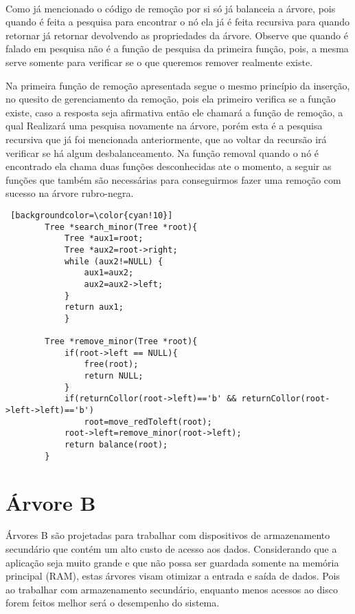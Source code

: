 \documentclass[report]{uftex}
\begin{document}
    \\Como já mencionado o código de remoção por si só já balanceia a árvore, pois quando é feita a pesquisa para encontrar o nó ela já é feita recursiva para quando retornar já retornar devolvendo as propriedades da árvore. Observe que quando é falado em pesquisa não é a função de pesquisa da primeira função, pois, a mesma serve somente para verificar se o que queremos remover realmente existe.
    
    Na primeira função de remoção apresentada segue o mesmo princípio da inserção, no quesito de gerenciamento da remoção, pois ela primeiro verifica se a função existe, caso a resposta seja afirmativa então ele chamará a função de remoção, a qual Realizará uma pesquisa novamente na árvore, porém esta é a pesquisa recursiva que já foi mencionada anteriormente, que ao voltar da recursão irá verificar se há algum desbalanceamento. Na função removal quando o nó é encontrado ela chama duas funções desconhecidas ate o momento, a seguir as funções que também são necessárias para conseguirmos fazer uma remoção com sucesso na árvore rubro-negra.
    
    \begin{lstlisting} [backgroundcolor=\color{cyan!10}]
        Tree *search_minor(Tree *root){
            Tree *aux1=root;
            Tree *aux2=root->right;
            while (aux2!=NULL) {
                aux1=aux2;
                aux2=aux2->left;
            }
            return aux1;
            }
            
        Tree *remove_minor(Tree *root){
            if(root->left == NULL){
                free(root);
                return NULL;
            }
            if(returnCollor(root->left)=='b' && returnCollor(root->left->left)=='b')
                root=move_redToleft(root);
            root->left=remove_minor(root->left);
            return balance(root);
        }
    \end{lstlisting}


\chapter{Árvore B}
\label{sec:b_tree}

    \noindent Árvores B são projetadas para trabalhar com dispositivos de armazenamento secundário que contém um alto custo de acesso aos dados. Considerando que a aplicação seja muito grande e que não possa ser guardada somente na memória principal (RAM), estas árvores visam otimizar a entrada e saída de dados. Pois ao trabalhar com armazenamento secundário, enquanto menos acessos ao disco forem feitos melhor será o desempenho do sistema.
    
\end{document}
